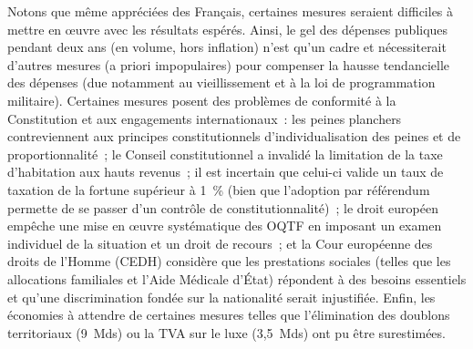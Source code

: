 \documentclass[12pt,french]{article}
\begin{document}
Notons que même appréciées des Français, certaines mesures seraient difficiles à mettre en œuvre avec les résultats espérés. Ainsi, le gel des dépenses publiques pendant deux ans (en volume, hors inflation) n'est qu'un cadre et nécessiterait d'autres mesures (a priori impopulaires) pour compenser la hausse tendancielle des dépenses (due notamment au vieillissement et à la loi de programmation militaire). Certaines mesures posent des problèmes de conformité à la Constitution et aux engagements internationaux~: les peines planchers contreviennent aux principes constitutionnels d'individualisation des peines et de proportionnalité~; %
le Conseil constitutionnel a invalidé la limitation de la taxe d'habitation aux hauts revenus~; %
il est incertain que celui-ci valide un taux de taxation de la fortune supérieur à 1~\% (bien que l'adoption par référendum permette de se passer d'un contrôle de constitutionnalité)~; le droit européen empêche une mise en œuvre systématique des OQTF en imposant un examen individuel de la situation et un droit de recours~; et %
la Cour européenne des droits de l'Homme (CEDH) considère que les prestations sociales (telles que les allocations familiales et l'Aide Médicale d'État) %
répondent à des besoins essentiels et qu'une discrimination fondée sur la nationalité serait injustifiée. Enfin, les économies à attendre de certaines mesures telles que l'élimination des doublons territoriaux (9~Mds) ou la TVA sur le luxe (3,5~Mds) ont pu être surestimées.

\end{document}

